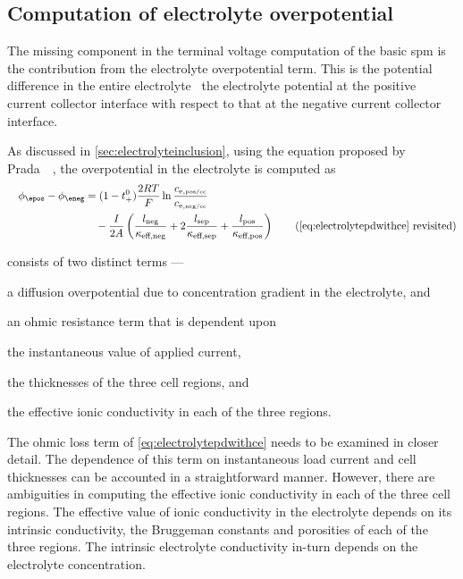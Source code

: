 \subsection{Computation of electrolyte overpotential}\label{subsec:electrolyteopcalc}

The missing component in the terminal voltage computation of the basic \gls{spm}
is  the  contribution from  the  electrolyte  overpotential  term. This  is  the
potential difference in  the entire electrolyte \ie~the electrolyte potential
at the positive current collector interface with respect to that at the negative
current collector interface.

As discussed in \cref{sec:electrolyteinclusion}, using  the equation proposed by
Prada~\etal~\cite{Prada2012}, the  overpotential in the electrolyte  is computed
as
\begin{align}
    \quad \phi_\epos - \phi_\eneg &= (1-t_{+}^0) \frac{2RT}{F}\ln \frac{c_\text{e,\tiny pos/cc}}{c_\text{e,\tiny neg/cc}}\nonumber\\
    {} &\quad -\frac{I}{2 A}\left(\frac{l_\text{neg}}{\kappa_\text{eff,neg}} + 2 \frac{l_\text{sep}}{\kappa_\text{eff,sep}} + \frac{l_\text{pos}}{\kappa_\text{eff,pos}}\right) \tag{\cref{eq:electrolytepdwithce} revisited}
\end{align}

 consists of two distinct terms ---
\begin{enumerate*}[label=\roman*)]
    \item a diffusion overpotential due to concentration gradient in the electrolyte, and
    \item an ohmic resistance term that is dependent upon
        \begin{enumerate*}[label=\itshape\alph*\upshape)]
            \item the instantaneous value of applied current,
            \item the thicknesses of the three cell regions, and
            \item the effective ionic conductivity in each of the three regions. %
        \end{enumerate*}
\end{enumerate*}

The ohmic  loss term  of \cref{eq:electrolytepdwithce} needs  to be  examined in
closer detail.  The dependence of  this term  on instantaneous load  current and
cell thicknesses  can be accounted  in a straightforward manner.  However, there
are ambiguities  in computing the  effective ionic  conductivity in each  of the
three cell regions. The effective value of ionic conductivity in the electrolyte
depends on its intrinsic conductivity, the Bruggeman constants and porosities of
each  of  the three  regions.  The  intrinsic electrolyte  conductivity  in-turn
depends on the electrolyte concentration.

